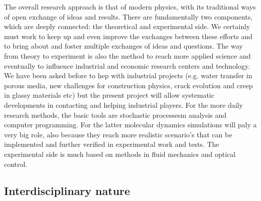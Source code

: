 The overall research approach is that of modern physics, with its traditional ways of open exchange of ideas and results.  There are fundamentally two components, which are deeply connected: the theoretical and experimental side.
We certainly must work to keep up and even improve the exchanges between these efforts and to bring about and foster multiple exchanges of ideas and questions.  The way from theory to experiment is also the method to reach more applied science and eventually to influence industrial and economic research centers and technology.  We have been asked before to hep with industrial projects (e.g. water transfer in porous media, new challenges for construction physics, crack evolution and creep in glassy materials etc) but the present project will allow systematic developments in contacting and helping industrial players.
For the more daily research methods, the basic tools are stochastic processesm analysis and computer programming.  For the latter molecular dynamics simulations will paly a very big role, also because they reach more realistic scenario's that can be implemented and further verified in experimental work and tests.  The experimental side is much based on methods in fluid mechanics and optical control.



\subsection{Interdisciplinary nature}\label{sec:interdisc}

